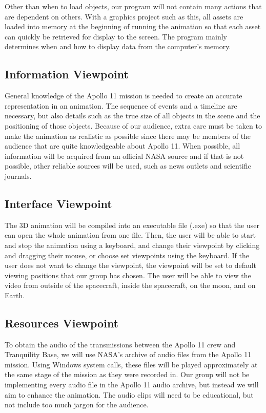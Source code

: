 \documentclass[onecolumn, draftclsnofoot,10pt, compsoc]{IEEEtran}
\begin{document}
    Other than when to load objects, our program will not contain many actions that are dependent on others. With a graphics project such as this, all assets are loaded into memory at the beginning of running the animation so that each asset can quickly be retrieved for display to the screen. The program mainly determines when and how to display data from the computer's memory. 
    
    \subsection{Information Viewpoint }

    General knowledge of the Apollo 11 mission is needed to create an accurate representation in an animation. The sequence of events and a timeline are necessary, but also details such as the true size of all objects in the scene and the positioning of those objects. Because of our audience, extra care must be taken to make the animation as realistic as possible since there may be members of the audience that are quite knowledgeable about Apollo 11. When possible, all information will be acquired from an official NASA source and if that is not possible, other reliable sources will be used, such as news outlets and scientific journals. 

    \subsection{Interface Viewpoint}
    
   The 3D animation will be compiled into an executable file (.exe) so that the user can open the whole animation from one file. Then, the user will be able to start and stop the animation using a keyboard, and change their viewpoint by clicking and dragging their mouse, or choose set viewpoints using the keyboard. If the user does not want to change the viewpoint, the viewpoint will be set to default viewing positions that our group has chosen. The user will be able to view the video from outside of the spacecraft, inside the spacecraft, on the moon, and on Earth. 

    \subsection{Resources Viewpoint}
    To obtain the audio of the transmissions between the Apollo 11 crew and Tranquility Base, we will use NASA's archive of audio files from the Apollo 11 mission. Using Windows system calls, these files will be played approximately at the same stage of the mission as they were recorded in. Our group will not be implementing every audio file in the Apollo 11 audio archive, but instead we will aim to enhance the animation. The audio clips will need to be educational, but not include too much jargon for the audience. 
\end{document}
